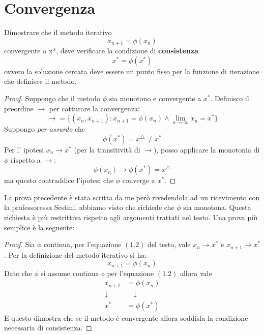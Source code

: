 \section{Convergenza}

\begin{exercise}[1.3] 
\label{exercise:exerciseIterativeMethodFixedPoint}
Dimostrare che il metodo iterativo $$x_{n+1}=\phi(x_{n})$$ convergente a x*,
deve verificare la condizione di \textbf{consistenza} $$x^{*}=\phi(x^{*})$$
ovvero la soluzione cercata deve essere un punto fisso per la funzione di
iterazione che definisce il metodo.
\end{exercise}
\begin{proof}
Suppongo che il metodo $\phi$ sia monotono e convergente a $x^{*}$. Definisco
il preordine $\rightarrow$ per catturare la convergenza:
\begin{displaymath}
\rightarrow = \lbrace (x_{n}, x_{n+1}) : x_{n+1} = \phi(x_{n}) \wedge \lim_{n
\rightarrow \infty}{x_{n}} = x^{*}
\rbrace
\end{displaymath}
Suppongo \emph{per assurdo} che $$\phi(x^{*}) = x^{\triangle} \not = x^{*}$$
Per l' ipotesi $x_{n} \rightarrow x^{*}$ (per la transitivit\`a di
$\rightarrow$), posso applicare la monotonia di $\phi$ rispetto a $\rightarrow$:
$$\phi(x_{n}) \rightarrow \phi(x^{*}) = x^{\triangle}$$ ma questo contraddice 
l'ipotesi che $\phi$ converge a $x^{*}$.
\end{proof}

\begin{oss}
La prova precedente \`e stata scritta da me per\`o rivedendola ad un ricevimento
con la professoressa Sestini, abbiamo visto che richiede che $\phi$ sia
monotona. Questa richiesta \`e pi\`u restrittiva rispetto agli argomenti
trattati nel testo. Una prova pi\`u semplice \`e la seguente:
\end{oss}
\begin{proof}
Sia $\phi$ continua, per l'equazione $(1.2)$ del testo, vale $x_{n} \rightarrow
x^{*}$ e $x_{n + 1} \rightarrow x^{*}$. Per la definizione del metodo iterativo
si ha:
\begin{displaymath}
x_{n + 1} = \phi(x_{n})
\end{displaymath}
Dato che $\phi$ si assume continua e per l'equazione $(1.2)$ allora vale
\begin{displaymath}
\begin{split}
x_{n + 1} &= \phi(x_{n}) \\
\downarrow & \quad \downarrow \\
x^{*} &= \phi(x^{*})
\end{split}
\end{displaymath}
E questo dimostra che se il metodo \`e convergente allora soddisfa la condizione
necessaria di consistenza.
\end{proof}

